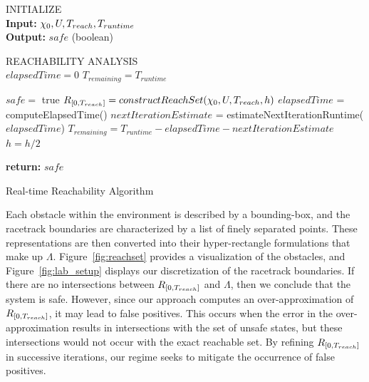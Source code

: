 \documentclass[manuscript,screen,review]{acmart}
\newcommand{\figref}[1]{Figure~\ref{#1}}
\begin{document}
\begin{algorithm}[htbp]%
\DontPrintSemicolon 
INITIALIZE{
\\
\textbf{Input:} $\chi_0,\mathnormal{U},T_{reach}, T_{runtime}$ \\
\textbf{Output:} $safe$ (boolean)
}

\vspace{2mm}

REACHABILITY ANALYSIS\\
$elapsedTime = 0$\;
$T_{remaining} = T_{runtime}$\;
 {
    $safe = $ true\;
    $\mathnormal{R}_{[0,T_{reach}]}= constructReachSet(\chi_0,\mathnormal{U},T_{reach},h)$\;
    $elapsedTime$ = computeElapsedTime()\;
    $nextIterationEstimate$ = estimateNextIterationRuntime($elapsedTime$)\;
    $T_{remaining} = T_{runtime} -elapsedTime - nextIterationEstimate$\;
    $h = h /2$\;
    
    
    
}
\textbf{return:} $safe$
\caption{Real-time Reachability Algorithm}
\label{alg:algo_rtreach}
\end{algorithm}%

Each obstacle within the environment is described by a bounding-box, and the racetrack boundaries are characterized by a list of finely separated points. These representations are then converted into their hyper-rectangle formulations that make up $\Lambda$. \figref{fig:reachset} provides a visualization of the obstacles, and \figref{fig:lab_setup} displays our discretization of the racetrack boundaries. If there are no intersections between $\mathnormal{R}_{[0,T_{reach}]}$ and $\Lambda$, then we conclude that the system is safe. However, since our approach computes an  over-approximation of $\mathnormal{R}_{[0,T_{reach}]}$, it may lead to false positives. This occurs when the error in the over-approximation results in intersections with the set of unsafe states, but these intersections would not occur with the exact reachable set. By refining $\mathnormal{R}_{[0,T_{reach}]}$ in successive iterations, our regime seeks to mitigate the occurrence of false positives.  
\end{document}
